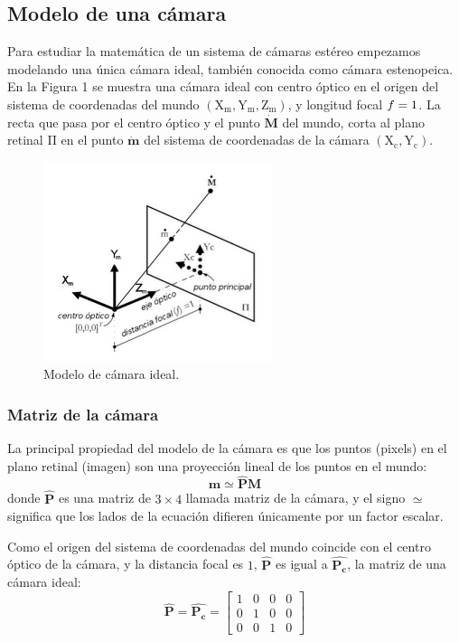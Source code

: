\documentclass[11pt,a4paper,titlepage]{article}
\newcommand{\Scalar}[1]{\ensuremath{\mathnormal{#1}}}
\newcommand{\Two}[1]{\ensuremath{\mathbf{#1}}}
\newcommand{\Three}[1]{\ensuremath{\mathbf{#1}}}
\newcommand{\Mat}[1]{\ensuremath{\mathbf{\hat{#1}}}}
\newcommand{\TwoCart}[1]{\ensuremath{\mathbf{\dot{#1}}}}
\newcommand{\ThreeCart}[1]{\ensuremath{\mathbf{\dot{#1}}}}
\newcommand{\Axis}[1]{\ensuremath{\mathrm{#1}}}
\newcommand{\Plane}[1]{\ensuremath{\mathrm{#1}}}
\newcommand{\Figure}[1]{Figura #1}
\begin{document}
\subsection{Modelo de una cámara}

Para estudiar la matemática de un sistema de cámaras estéreo empezamos modelando una única cámara ideal, también conocida como cámara estenopeica. En la \Figure{1} se muestra una cámara ideal con centro óptico en el origen del sistema de coordenadas del mundo $\left( \Axis{X_m}, \Axis{Y_m}, \Axis{Z_m} \right)$, y longitud focal $\Scalar{f} = 1$. La recta que pasa por el centro óptico y el punto \ThreeCart{M} del mundo, corta al plano retinal \Plane{\Pi} en el punto \TwoCart{m} del sistema de coordenadas de la cámara $\left( \Axis{X_c}, \Axis{Y_c} \right)$.


\begin{figure}[h!]

  \centering
    \includegraphics[width=0.6\textwidth]{f1.png}
  \caption{Modelo de cámara ideal.}
\end{figure}

\subsubsection{Matriz de la cámara}

La principal propiedad del modelo de la cámara es que los puntos (pixels) en el plano retinal (imagen) son una proyección lineal de los puntos en el mundo:
\[
	\Two{m} \simeq \Mat{P}\Three{M}
\]
donde \Mat{P} es una matriz de $3 \times 4$ llamada matriz de la cámara, y el signo $\simeq$ significa que los lados de la ecuación difieren únicamente por un factor escalar.

Como el origen del sistema de coordenadas del mundo coincide con el centro óptico de la cámara, y la distancia focal es $1$, \Mat{P} es igual a $\Mat{P_c}$, la matriz de una cámara ideal:
\[
	\Mat{P} = \Mat{P_c} =
	\begin{bmatrix}
		1 & 0 & 0 & 0 \\
		0 & 1 & 0 & 0 \\
		0 & 0 & 1 & 0
	\end{bmatrix}
\]
\end{document}
